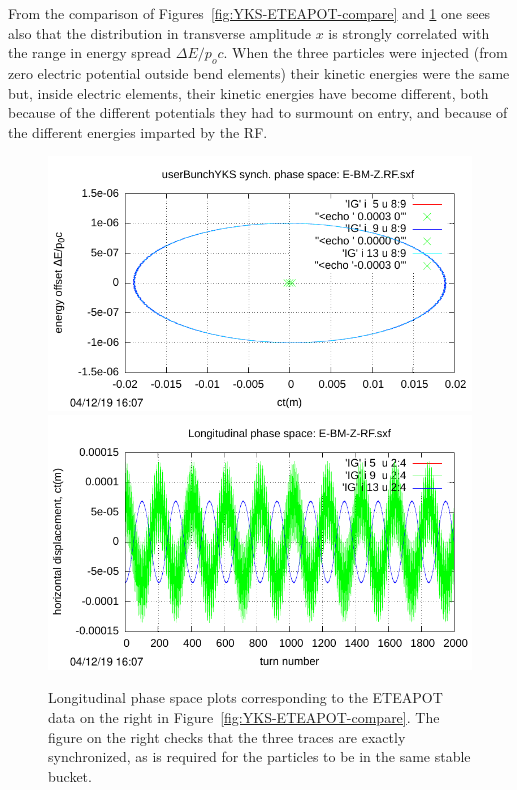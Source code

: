\documentclass[12]{article}
\begin{document}
From the comparison of 
Figures~\ref{fig:YKS-ETEAPOT-compare} and \ref{fig:RK-compare-longit}
one sees also that the 
distribution in transverse amplitude $x$ is strongly correlated
with the range in energy spread $\Delta E/p_oc$. When the
three particles were injected (from zero electric potential outside
bend elements) their kinetic energies were the 
same but, inside electric elements, their kinetic energies have become
different, both because of the different potentials they had to
surmount on entry, and because of the different energies imparted 
by the RF.  

\begin{figure}[h]
\centering
\includegraphics[scale=0.6]{pdf/BM-IV_Figure6l.pdf}
\includegraphics[scale=0.6]{pdf/BM-IV_Figure6r.pdf}
\caption{\label{fig:RK-compare-longit}Longitudinal phase 
space plots corresponding to the ETEAPOT data on the 
right in Figure~\ref{fig:YKS-ETEAPOT-compare}. The figure
on the right checks that the three traces are exactly
synchronized, as is required for the particles to be in
the same stable bucket.}
\end{figure}
\end{document}
